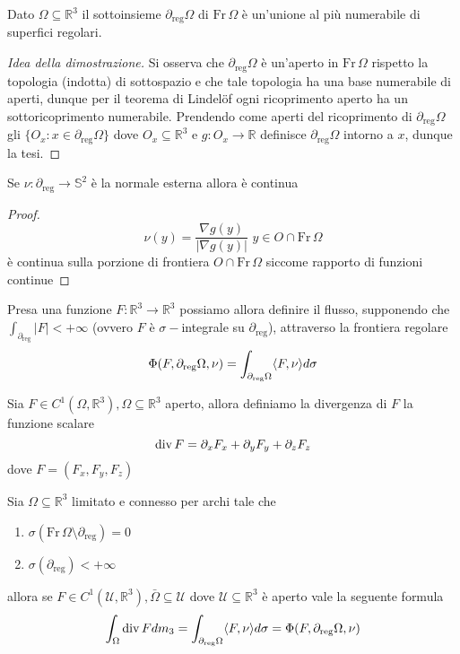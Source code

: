 \begin{prop}
	Dato $\Omega \subseteq \mathbb{R}^3$ il sottoinsieme $\partial_{\text{reg}} \Omega$ di $\text{Fr} \, \Omega$ è un'unione al più numerabile di superfici regolari.
\end{prop}
\begin{proof}[Idea della dimostrazione]
Si osserva che $\partial_{\text{reg}} \Omega$ è un'aperto in $\text{Fr} \, \Omega$ rispetto la topologia (indotta) di sottospazio e che tale topologia ha una base numerabile di aperti, dunque per il teorema di Lindelöf ogni ricoprimento aperto
ha un sottoricoprimento numerabile. Prendendo come aperti del ricoprimento di $\partial_{\text{reg}} \Omega$ gli $\{O_x : x \in \partial_{\text{reg}} \Omega \}$ dove $O_x \subseteq \mathbb{R}^3$ e $g: O_x \to \mathbb{R}$ definisce $\partial_{\text{reg}} \Omega$
intorno a $x$, dunque la tesi.
\end{proof}
\begin{prop}
Se $\nu: \partial_{\text{reg}} \to \mathbb{S}^2$ è la normale esterna allora è continua
\end{prop}
\begin{proof}
$$
\nu(y) = \frac{\nabla g(y)}{|\nabla g(y)|} \, \, y \in O \cap \text{Fr} \, \Omega
$$
è continua sulla porzione di frontiera $O \cap \text{Fr} \, \Omega$ siccome rapporto di funzioni continue
\end{proof}
Presa una funzione $F: \mathbb{R}^3 \to \mathbb{R}^3$ possiamo allora definire il flusso, supponendo che $\int_{\partial_{\text{reg}}} |F| < +\infty$ (ovvero $F$ è $\sigma-$integrale su $\partial_{\text{reg}}$), attraverso la frontiera regolare
$$
\Phi(F, \partial_{\text{reg}} \Omega, \nu) = \int_{\partial_{\text{reg}} \Omega} \langle F, \nu \rangle d \sigma
$$
\begin{definition}[divergenza]
	Sia $F \in C^1(\Omega, \mathbb{R}^3), \Omega \subseteq \mathbb{R}^3$ aperto, allora definiamo la divergenza di $F$ la funzione scalare
	$$
	\operatorname{div} F = \partial_x F_x + \partial_y F_y + \partial_z F_z
	$$
	dove $F=(F_x, F_y, F_z)$
\end{definition}
\begin{theorem}
	Sia $\Omega \subseteq \mathbb{R}^3$ limitato e connesso per archi tale che
	\begin{enumerate}[label=\protect\circled{\arabic*}]
		\item $\sigma(\text{Fr} \, \Omega \setminus \partial_{\text{reg}}) = 0$
		\item $\sigma(\partial_{\text{reg}}) < +\infty$
	\end{enumerate}
	allora se $F \in C^1(\mathcal{U}, \mathbb{R}^3), \bar{\Omega} \subseteq \mathcal{U}$ dove $\mathcal{U} \subseteq \mathbb{R}^3$ è aperto vale la seguente formula
	$$
	\int_\Omega \operatorname{div} F dm_3 = \int_{\partial_{\text{reg}} \Omega} \langle F, \nu \rangle d\sigma = \Phi(F, \partial_{\text{reg}} \Omega, \nu)
	$$
\end{theorem}
